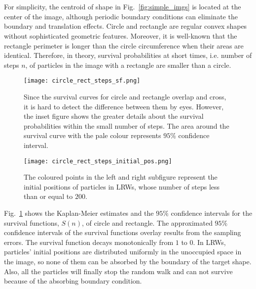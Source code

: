 


\section{}\label{section:circle_rectangle}


For simplicity, the centroid of shape in Fig.~\ref{fig:simple_imgs} is
located at the center of the image, although periodic boundary
conditions can eliminate the boundary and translation effects. Circle
and rectangle are regular convex shapes without sophisticated
geometric features. Moreover, it is well-known that the rectangle
perimeter is longer than the circle circumference when their areas are
identical. Therefore, in theory, survival probabilities at short
times, i.e. number of steps $n$, of particles in the image with a
rectangle are smaller than a circle.


    \begin{figure}
      \centering
      \texttt{[image: circle\_rect\_steps\_sf.png]}
      \caption{Since the survival curves for circle and rectangle overlap and cross, it is hard to detect the difference between them by eyes. However, the inset figure shows the greater details about the survival probabilities within the small number of steps. The area around the survival curve with the pale colour represents $95\%$ confidence interval.}
      \label{fig:sf_simple_shape_steps}
    \end{figure}


   \begin{figure}
      \centering
      \texttt{[image: circle\_rect\_steps\_initial\_pos.png]}
      \caption{The coloured points in the left and right subfigure represent the initial positions of particles in LRWs, whose number of steps less than or equal to $200$.}
      \label{fig:cir_rect_steps_initial_pos}
    \end{figure}


Fig.~\ref{fig:sf_simple_shape_steps} shows the Kaplan-Meier estimates
and the $95\%$ confidence intervals for the survival functions,
$S(n)$, of circle and rectangle. The approximated $95\%$ confidence
intervals of the survival functions overlay results from the sampling
errors. The survival function decays monotonically from $1$ to $0$. In
LRWs, particles' initial positions are distributed uniformly in the
unoccupied space in the image, so none of them can be absorbed by the
boundary of the target shape. Also, all the particles will finally
stop the random walk and can not survive because of the absorbing
boundary condition.


